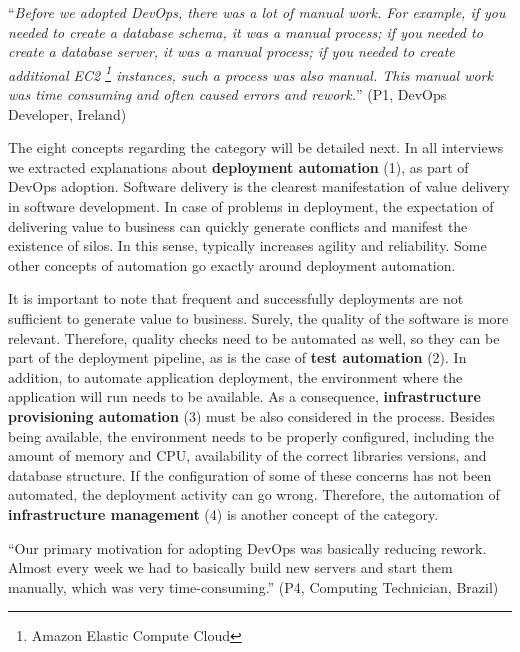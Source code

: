 \begin{mq}
``\emph{Before we adopted DevOps, there was a lot of manual work. For example, if you
needed to create a database schema, it was a manual process; if you needed to create a
database server, it was a manual process; if you needed to create additional EC2 \footnote{Amazon Elastic
Compute Cloud} instances, such a process was also manual.
This manual work was time consuming and often caused errors and
rework.}'' (P1, DevOps Developer, Ireland)
\end{mq}

The eight concepts regarding the  category will be detailed next.
In all interviews we extracted explanations about \textbf{deployment
automation} (1), as part of DevOps adoption. Software delivery is the clearest
manifestation of value delivery in software development. In case of problems
in deployment, the expectation of delivering value to business can quickly
generate conflicts and manifest the existence of silos.
In this sense,  typically increases agility and reliability. Some other
concepts of automation go exactly around deployment automation.

It is important to note that frequent and successfully
deployments are not sufficient to generate value to business. Surely, the quality of
the software is more relevant. Therefore, quality checks need to be automated as well, so they can be part of the
deployment pipeline, as is the case of \textbf{test automation} (2). In addition, to
automate application deployment, the environment where the
application will run needs to be available. As a consequence, \textbf{infrastructure
provisioning automation} (3) must be also considered in the process. Besides being available,
the environment needs to be properly configured, including the amount of memory and CPU,
availability of the correct libraries versions, and database structure. If the configuration of some of these concerns
has not been automated, the deployment activity can go wrong. Therefore,
the automation of \textbf{infrastructure management} (4) is another
concept of the  category.

\begin{mq}
``Our primary motivation for adopting DevOps was basically reducing rework.
Almost every week we had to basically build new servers and
start them manually, which was very time-consuming.''
(P4, Computing Technician, Brazil)
\end{mq}

